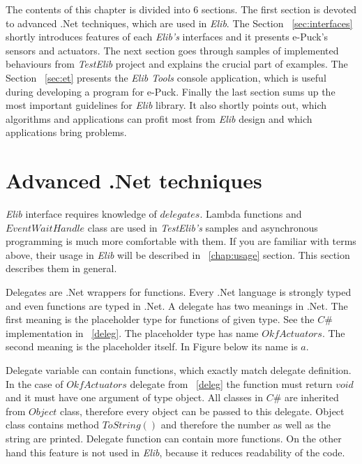 \documentclass[12pt,notitlepage]{report}
\begin{document}
        The contents of this chapter is divided into 6 sections.
	The first section is devoted to advanced .Net techniques, which are used in {\it Elib}.
	The Section ~\ref{sec:interfaces} shortly introduces features of each {\it Elib's} interfaces and 
	it presents e-Puck's sensors and actuators.
	The next section goes through samples of implemented behaviours from {\it TestElib} project and explains the crucial part of examples.
	The Section ~\ref{sec:et} presents the {\it Elib Tools} console application, which is useful during developing a program for e-Puck.
	Finally the last section sums up the most important guidelines for {\it Elib} library.
	It also shortly points out, which algorithms and applications can profit most
	from {\it Elib} design and which applications bring problems.
	
\section{Advanced .Net techniques} \label{sec:net}
	{\it Elib} interface requires knowledge of $delegates$. Lambda functions and $EventWaitHandle$ class
	are used in {\it TestElib's} samples and asynchronous programming is much more comfortable with them.
	If you are familiar with terms above, their usage in {\it Elib} will be described in ~\ref{chap:usage} section.
	This section describes them in general.

	Delegates are .Net wrappers for functions. Every .Net language is strongly typed and even functions are typed in .Net.
	A delegate has two meanings in .Net. The first meaning is the placeholder type for functions of given type. 
	See the $C\#$ implementation in ~\ref{deleg}. The placeholder type has name $OkfActuators$.
	The second meaning is the placeholder itself. In Figure below its name is $a$.

	Delegate variable can contain functions, which exactly match delegate definition. In the case of $OkfActuators$ 
	delegate from ~\ref{deleg} the function must return
	$void$ and it must have one argument of type object. All classes in $C\#$ are inherited from $Object$ class, 
	therefore every object can be passed to this delegate. 
	Object class contains method $ToString()$ and therefore the number as well as the string are printed.  
	Delegate function can contain more functions. On the other hand this feature is not used in {\it Elib}, 
	because it reduces readability of the code.
	
\end{document}
